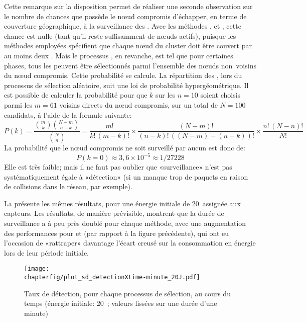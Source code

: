 Cette remarque sur la disposition permet de réaliser une seconde observation sur le nombre de chances que possède le nœud compromis d'échapper, en terme de couverture géographique, à la surveillance des \cns.
Avec les méthodes \ideres, \iddemx et \iddems, cette chance est nulle (tant qu'il reste suffisamment de nœuds actifs), puisque les méthodes employées spécifient que chaque nœud du cluster doit être couvert par au moins deux \cns.
Mais le processus \idrand, en revanche, est tel que pour certaines phases, tous les \cns peuvent être sélectionnés parmi l'ensemble des nœuds non~voisins du nœud compromis.
Cette probabilité se calcule.
La répartition des \cns, lors du processus de sélection aléatoire, suit une loi de probabilité hypergéométrique.
Il est possible de calculer la probabilité pour que $k$ \cns sur les $n=10$ soient choisis parmi les $m=61$ voisins directs du nœud compromis, sur un total de $N=100$ candidats, à l'aide de la formule suivante:
$$P(k) = \frac{{m\choose k}{N-m\choose n-k}}{{N\choose n}}=
\frac{m!}{k!\,(m-k)!}\times\frac{(N-m)!}{(n-k)!\,((N-m)-(n-k))!}\times\frac{n!\,(N-n)!}{N!}$$
La probabilité que le nœud compromis ne soit surveillé par aucun \cn est donc de:
$$P(k=0)\approx3,6\times10^{-5}\approx1/27228$$
Elle est très faible; mais il ne faut pas oublier que «surveillance» n'est pas systématiquement égale à «détection» (si un \cn manque trop de paquets en raison de collisions dans le réseau, par exemple).

La  présente les mêmes résultats, pour une énergie initiale de 20~\joule assignée aux capteurs.
Les résultats, de manière prévisible, montrent que la durée de surveillance a à peu près doublé pour chaque méthode, avec une augmentation des performances pour \iddemx et \iddems (par rapport à la figure précédente), qui ont eu l'occasion de «rattraper» davantage l'écart creusé sur la consommation en énergie lors de leur période initiale.
\begin{figure}[!b]
    \centering
    \texttt{[image: \\chapterfig/plot\_sd\_detectionXtime-minute\_20J.pdf]}
    \caption[Taux de détection au cours du temps (énergie initiale: 20~\joule)]{Taux de détection, pour chaque processus de sélection, au cours du temps (énergie initiale: 20~\joule; valeurs lissées sur une durée d'une minute)}\label{sd:fig:detec-min-20J}
\end{figure}
